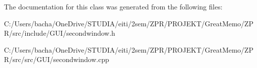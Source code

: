 The documentation for this class was generated from the following files\+:\begin{DoxyCompactItemize}
\item 
C\+:/\+Users/bacha/\+One\+Drive/\+S\+T\+U\+D\+I\+A/eiti/2sem/\+Z\+P\+R/\+P\+R\+O\+J\+E\+K\+T/\+Great\+Memo/\+Z\+P\+R/src/include/\+G\+U\+I/secondwindow.\+h\item 
C\+:/\+Users/bacha/\+One\+Drive/\+S\+T\+U\+D\+I\+A/eiti/2sem/\+Z\+P\+R/\+P\+R\+O\+J\+E\+K\+T/\+Great\+Memo/\+Z\+P\+R/src/src/\+G\+U\+I/secondwindow.\+cpp\end{DoxyCompactItemize}
